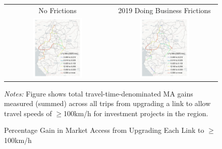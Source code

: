 \documentclass[a4paper]{article}
\begin{document}
\begin{figure}[H]  \vspace{-3mm}
\centering
\caption{\label{fig:MA_TT_PP} Percentage Gain in Market Access from Upgrading Each Link to $\geq$100km/h}
\vspace{2mm}
\begin{tabular}{cc}
No Frictions & 2019 Doing Business Frictions \\
\includegraphics[width=0.48\textwidth]{"../figures/PE/trans_CEMAC_network_MA_100_min_speed_perc_planned_projects.pdf"} &
\includegraphics[width=0.48\textwidth]{"../figures/PE/trans_CEMAC_network_MA_100_min_speed_bt_perc_planned_projects.pdf"}  \\ [-0.2em]
\end{tabular}
\raggedright
\scriptsize 
\emph{Notes:} Figure shows total travel-time-denominated MA gains measured (summed) across all trips from upgrading a link to allow travel speeds of $\geq$100km/h for investment projects in the region.   \vspace{-10mm}
\end{figure}
\end{document}
